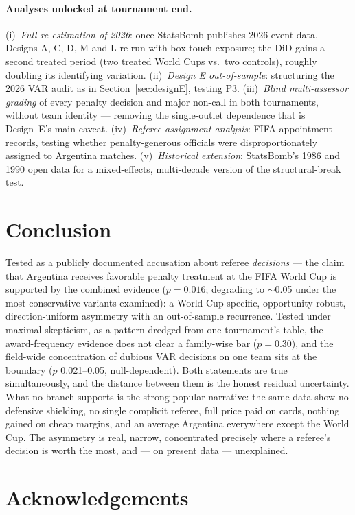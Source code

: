 \documentclass[11pt,a4paper]{article}
\newcommand{\pv}[1]{\ensuremath{p = #1}}
\begin{document}
\paragraph{Analyses unlocked at tournament end.}
(i)~\emph{Full re-estimation of 2026}: once StatsBomb publishes 2026 event data,
Designs A, C, D, M and L re-run with box-touch exposure; the DiD gains a second
treated period (two treated World Cups vs.\ two controls), roughly doubling its
identifying variation. (ii)~\emph{Design E out-of-sample}: structuring the 2026 VAR
audit as in Section~\ref{sec:designE}, testing P3. (iii)~\emph{Blind multi-assessor
grading} of every penalty decision and major non-call in both tournaments, without
team identity --- removing the single-outlet dependence that is Design~E's main
caveat. (iv)~\emph{Referee-assignment analysis}: FIFA appointment records, testing
whether penalty-generous officials were disproportionately assigned to Argentina
matches. (v)~\emph{Historical extension}: StatsBomb's 1986 and 1990 open data for a
mixed-effects, multi-decade version of the structural-break test.

\section{Conclusion}

Tested as a publicly documented accusation about referee
\emph{decisions} --- the claim that Argentina receives favorable penalty treatment at
the FIFA World Cup is supported by the combined evidence (\pv{0.016}; degrading to
$\sim$0.05 under the most conservative variants examined): a
World-Cup-specific, opportunity-robust, direction-uniform asymmetry with an
out-of-sample recurrence. Tested under maximal skepticism, as a pattern dredged from
one tournament's table, the award-frequency evidence does not clear a family-wise bar
(\pv{0.30}), and the field-wide concentration of dubious VAR decisions on one team
sits at the boundary ($p$ 0.021--0.05, null-dependent). Both
statements are true simultaneously, and the distance between them is the honest
residual uncertainty. What no branch supports is the strong popular narrative:
the same data show no defensive shielding, no single complicit referee, full price
paid on cards, nothing gained on cheap margins, and an
average Argentina everywhere except the World Cup. The asymmetry is real, narrow,
concentrated precisely where a referee's decision is worth the most,
and --- on present data --- unexplained.

\section*{Acknowledgements}
\end{document}
